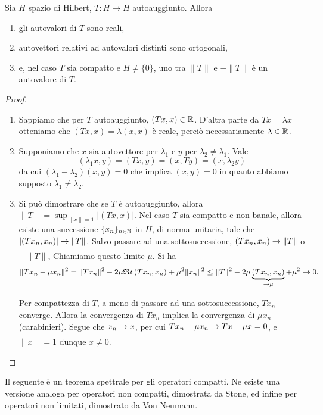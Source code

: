 \begin{lemma}
\label{lemma:ops_spectral_selfadjoint}
	Sia $H$ spazio di Hilbert, $T:H \to H$ autoauggiunto.
	Allora
	\begin{enumerate}
		\item gli autovalori di $T$ sono reali,
		\item autovettori relativi ad autovalori distinti sono ortogonali,
		\item e, nel caso $T$ sia compatto e $H\neq \{0\}$, uno tra $\|T\|$ e $-\|T\|$ è un autovalore di $T$.
	\end{enumerate}
\end{lemma}
\begin{proof}
	\leavevmode
	\begin{enumerate}
		\item Sappiamo che per $T$ autoauggiunto, $(Tx,x) \in \mathbb{R}$. D'altra parte da $Tx=\lambda x$ otteniamo che $(Tx,x) = \lambda (x,x)$ è reale, perciò necessariamente $\lambda \in \mathbb{R}$.
		\item Supponiamo che $x$ sia autovettore per $\lambda_1$ e $y$ per $\lambda_2 \neq \lambda_1$. Vale
		\begin{equation*}
			(\lambda_1 x, y) = (Tx, y) = (x, Ty) = (x, \lambda_2 y)
		\end{equation*}
		da cui $(\lambda_1 - \lambda_2)(x,y) = 0$ che implica $(x,y) = 0$ in quanto abbiamo supposto $\lambda_1 \neq \lambda_2$.
		\item Si può dimostrare che se $T$ è autoauggiunto, allora $\|T\| = \sup_{\|x\|=1} |(Tx,x)|$. Nel caso $T$ sia compatto e non banale, allora esiste una successione $\{x_n\}_{n \in \mathbb{N}}$ in $H$, di norma unitaria, tale che $|(Tx_n,x_n)| \underset{{}}{\rightarrow} \|T\|$.
		Salvo passare ad una sottosuccessione, $(Tx_n, x_n) \underset{{}}{\rightarrow} \|T\|$ o $-\|T\|$, Chiamiamo questo limite $\mu$. Si ha
		\begin{equation*}
			\|Tx_n - \mu x_n\|^2  = \|Tx_n\|^2 - 2 \mu \mathfrak{Re}\left(Tx_n, x_n\right) + \mu^2 \|x_n\|^2 \leq \|T\|^2 - 2\mu \underbrace{(Tx_n, x_n)}_{\underset{{}}{\rightarrow} \mu} + \mu^2 \underset{{}}{\rightarrow} 0.
		\end{equation*}
		Per compattezza di $T$, a meno di passare ad una sottosuccessione, $Tx_n$ converge. Allora la convergenza di $Tx_n$ implica la convergenza di $\mu x_n$ (carabinieri). Segue che $x_n \underset{{}}{\rightarrow} x$, per cui $Tx_n - \mu x_n \underset{{}}{\rightarrow} Tx - \mu x = 0$, e $\|x\| =1$ dunque $x \neq 0$.
	\end{enumerate}
\end{proof}

Il seguente è un teorema spettrale per gli operatori compatti. Ne esiste una versione analoga per operatori non compatti, dimostrata da Stone, ed infine per operatori non limitati, dimostrato da Von Neumann.

